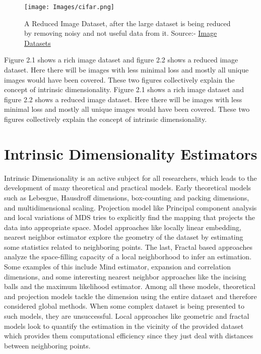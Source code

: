 \documentclass[12pt,letterpaper]{report}
\begin{document}
\newpage
\begin{figure}[h]
    \centering
    \begin{center}
        \texttt{[image: Images/cifar.png]} 
    \end{center}
    \caption{A Reduced Image Dataset, after the large dataset is being reduced by removing noisy and not useful data from it. Source:- \href{https://www.analyticsvidhya.com/blog/2018/03/comprehensive-collection-deep-learning-datasets/}{Image Datasets}}
    \label{fig:A Reduced Image Dataset.}
\end{figure}

Figure 2.1 shows a rich image dataset and figure 2.2 shows a reduced image dataset. Here there will be images with less minimal loss and mostly all unique images would have been covered. These two figures collectively explain the concept of intrinsic dimensionality. Figure 2.1 shows a rich image dataset and figure 2.2 shows a reduced image dataset. Here there will be images with less minimal loss and mostly all unique images would have been covered. These two figures collectively explain the concept of intrinsic dimensionality.\\

\section{Intrinsic Dimensionality Estimators}
Intrinsic Dimensionality is an active subject for all researchers, which leads to the development of many theoretical and practical models. Early theoretical models such as Lebesgue, Hausdroff dimensions, box-counting and packing dimensions, and multidimensional scaling. Projection model like Principal component analysis and local variations of MDS tries to explicitly find the mapping that projects the data into appropriate space. Model approaches like locally linear embedding, nearest neighbor estimator explore the geometry of the dataset by estimating some statistics related to neighboring points. The last, Fractal based approaches analyze the space-filling capacity of a local neighborhood to infer an estimation. Some examples of this include Mind estimator, expansion and correlation dimensions, and some interesting nearest neighbor approaches like the incising balls and the maximum likelihood estimator. Among all these models, theoretical and projection models tackle the dimension using the entire dataset and therefore considered global methods. When some complex dataset is being presented to such models, they are unsuccessful. Local approaches like geometric and fractal models look to quantify the estimation in the vicinity of the provided dataset which provides them computational efficiency since they just deal with distances between neighboring points.\\
\end{document}
